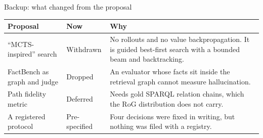\begin{frame}{Backup: what changed from the proposal}
  \begin{table}
    \small
    \begin{tabular}{@{}L{34mm}L{24mm}L{72mm}@{}}
      \toprule
      \textbf{Proposal} & \textbf{Now} & \textbf{Why} \\
      \midrule
      ``MCTS-inspired'' search & Withdrawn
        & No rollouts and no value backpropagation. It is guided best-first
          search with a bounded beam and backtracking. \\
      \midrule
      FactBench as graph and judge & Dropped
        & An evaluator whose facts sit inside the retrieval graph cannot
          measure hallucination. \\
      \midrule
      Path fidelity metric & Deferred
        & Needs gold SPARQL relation chains, which the RoG distribution
          does not carry. \\
      \midrule
      A registered protocol & Pre-specified
        & Four decisions were fixed in writing, but nothing was filed with
          a registry. \\
      \bottomrule
    \end{tabular}
  \end{table}
  \centrebody
\end{frame}

